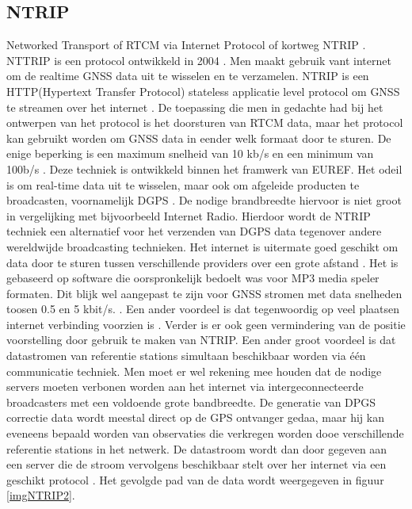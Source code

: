 \subsection{NTRIP}
\label{LNTR}
Networked Transport of RTCM via Internet Protocol of kortweg NTRIP \cite{LBibNTRIP,LBibNTRIP3}. NTTRIP is een protocol ontwikkeld in 2004 \cite{LBibNTRIP3}. Men maakt gebruik vant internet om de realtime GNSS data uit te wisselen en te verzamelen. NTRIP is een HTTP(Hypertext Transfer Protocol) stateless applicatie level protocol om GNSS te streamen over het internet \cite{LBibNTRIP}. De toepassing die men in gedachte had bij het ontwerpen van het protocol is het doorsturen van RTCM data, maar het protocol kan gebruikt worden om GNSS data in eender welk formaat door te sturen. De enige beperking is een maximum snelheid van 10 kb/s en een minimum van 100b/s \cite{LBibNTRIP3}. Deze techniek is ontwikkeld binnen het framwerk van EUREF. Het odeil is om real-time data uit te wisselen, maar ook om afgeleide producten te broadcasten, voornamelijk DGPS \cite{LBibNTRIP2}. De nodige brandbreedte hiervoor is niet groot in vergelijking met bijvoorbeeld Internet Radio\cite{LBibNTRIP}. Hierdoor wordt de NTRIP techniek een alternatief voor het verzenden van DGPS data tegenover andere  wereldwijde broadcasting technieken. Het internet is uitermate goed geschikt om data door te sturen tussen verschillende providers over een grote afstand \cite{LBibNTRIP2}. Het is gebaseerd op software die oorspronkelijk bedoelt was voor MP3 media speler formaten. Dit blijk wel aangepast te zijn voor GNSS stromen met data snelheden toosen 0.5 en 5 kbit/s. \cite{LBibGPS}. Een ander voordeel is dat tegenwoordig op veel plaatsen internet verbinding voorzien is \cite{LBibNTRIP}. Verder is er ook geen vermindering van de positie voorstelling door gebruik te maken van NTRIP. Een ander groot voordeel is dat datastromen van referentie stations simultaan beschikbaar worden via \'e\'en communicatie techniek. Men moet er wel rekening mee houden dat de nodige servers moeten verbonen worden aan het internet via intergeconnecteerde broadcasters met een voldoende grote bandbreedte.  De generatie van DPGS correctie data wordt meestal direct op de GPS ontvanger gedaa, maar hij kan eveneens bepaald worden van observaties die verkregen worden dooe verschillende referentie stations in het netwerk. De datastroom wordt dan door gegeven aan een server die de stroom vervolgens beschikbaar stelt over her internet via een geschikt protocol \cite{LBibNTRIP2}. Het gevolgde pad van de data wordt weergegeven in figuur \ref{imgNTRIP2}.
